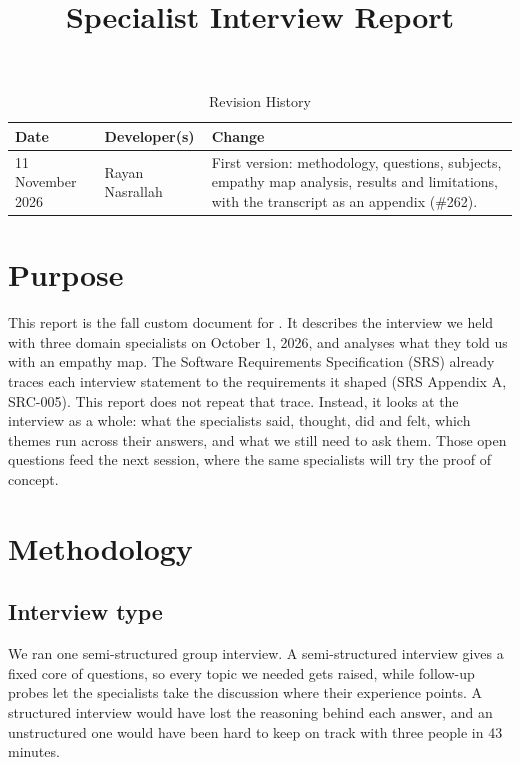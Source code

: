 \documentclass{article}
\title{Specialist Interview Report\\\progname}
\author{\authname}
\date{}
\begin{document}
\maketitle

\begin{table}[hp]
\caption{Revision History} \label{TblRevisionHistory}
\begin{tabularx}{\textwidth}{llX}
\toprule
\textbf{Date} & \textbf{Developer(s)} & \textbf{Change}\\
\midrule
11 November 2026 & Rayan Nasrallah & First version: methodology, questions,
subjects, empathy map analysis, results and limitations, with the transcript
as an appendix (\#262).\\
\bottomrule
\end{tabularx}
\end{table}

\newpage
\tableofcontents
\newpage

\section{Purpose}

This report is the fall custom document for \progname{}. It describes the
interview we held with three domain specialists on October 1, 2026, and
analyses what they told us with an empathy map. The Software Requirements
Specification (SRS) already traces each interview statement to the
requirements it shaped (SRS Appendix A, SRC-005). This report does not repeat
that trace. Instead, it looks at the interview as a whole: what the
specialists said, thought, did and felt, which themes run across their
answers, and what we still need to ask them. Those open questions feed the
next session, where the same specialists will try the proof of concept.

\section{Methodology}

\subsection{Interview type}

We ran one semi-structured group interview. A semi-structured interview gives
a fixed core of questions, so every topic we needed gets raised, while
follow-up probes let the specialists take the discussion where their
experience points. A structured interview would have lost the reasoning
behind each answer, and an unstructured one would have been hard to keep on
track with three people in 43 minutes.
\end{document}
